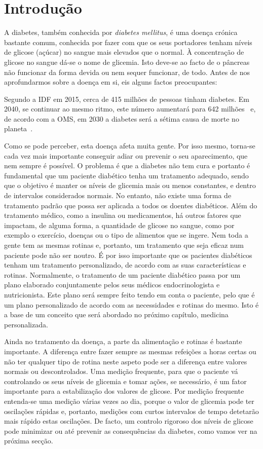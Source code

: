 \chapter{Introdução}\label{chap:intro}


A diabetes, também conhecida por \textit{diabetes mellitus}, é uma doença crónica bastante comum, conhecida por fazer com que os seus portadores tenham níveis de glicose (açúcar) no sangue mais elevados que o normal. À concentração de glicose no sangue dá-se o nome de glicemia. Isto deve-se ao facto de o pâncreas não funcionar da forma devida ou nem sequer funcionar, de todo. Antes de nos aprofundarmos sobre a doença em si, eis alguns factos preocupantes:

Segundo a \ac{IDF} em 2015, cerca de 415 milhões de pessoas tinham diabetes. Em 2040, se continuar ao mesmo ritmo, este número aumentará para 642 milhões~\cite{atlas} e, de acordo com a \ac{OMS}, em 2030 a diabetes será a sétima causa de morte no planeta~\cite{who}.

Como se pode perceber, esta doença afeta muita gente. Por isso mesmo, torna-se cada vez mais importante conseguir adiar ou prevenir o seu aparecimento, que nem sempre é possível. O problema é que a diabetes não tem cura e portanto é fundamental que um paciente diabético tenha um tratamento adequado, sendo que o objetivo é manter os níveis de glicemia mais ou menos constantes, e dentro de intervalos considerados normais.
No entanto, não existe uma forma de tratamento padrão que possa ser aplicada a todos os doentes diabéticos. Além do tratamento médico, como a insulina ou medicamentos, há outros fatores que impactam, de alguma forma, a quantidade de glicose no sangue, como por exemplo o exercício, doenças ou o tipo de alimentos que se ingere. 
Nem toda a gente tem as mesmas rotinas e, portanto, um tratamento que seja eficaz num paciente pode não ser noutro. É por isso importante que os pacientes diabéticos tenham um tratamento personalizado, de acordo com as suas características e rotinas. Normalmente, o tratamento de um paciente diabético passa por um plano elaborado conjuntamente pelos seus médicos endocrinologista e nutricionista. Este plano será sempre feito tendo em conta o paciente, pelo que é um plano personalizado de acordo com as necessidades e rotinas do mesmo. Isto é a base de um conceito que será abordado no próximo capítulo, medicina personalizada.

Ainda no tratamento da doença, a parte da alimentação e rotinas é bastante importante. A diferença entre fazer sempre as mesmas refeições a horas certas ou não ter qualquer tipo de rotina neste aspeto pode ser a diferença entre valores normais ou descontrolados. Uma medição frequente, para que o paciente vá controlando os seus níveis de glicemia e tomar ações, se necessário, é um fator importante para a estabilização dos valores de glicose. Por medição frequente entenda-se uma medição várias vezes ao dia, porque o valor de glicemia pode ter oscilações rápidas e, portanto, medições com curtos intervalos de tempo detetarão mais rápido estas oscilações.
De facto, um controlo rigoroso dos níveis de glicose pode minimizar ou até prevenir as consequências da diabetes, como vamos ver na próxima secção.



